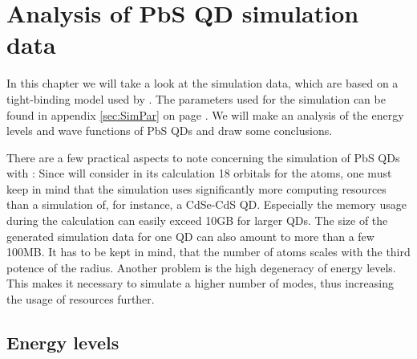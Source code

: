 \chapter{Analysis of PbS QD simulation data}

In this chapter we will take a look at the simulation data, which are based on a tight-binding model used by \omen. The parameters used for the simulation can be found in appendix \ref{sec:SimPar} on page \pageref{sec:SimPar}. We will make an analysis of the energy levels and wave functions of PbS QDs and draw some conclusions.\\

\begin{REMARK} 
There are a few practical aspects to note concerning the simulation of PbS QDs with \omen: Since \omen will consider in its calculation 18 orbitals for the atoms, one must keep in mind that the simulation uses significantly more computing resources than a simulation of, for instance, a CdSe-CdS QD. Especially the memory usage during the calculation can easily exceed 10GB for larger QDs. The size of the generated simulation data for one QD can also amount to more than a few 100MB. It has to be kept in mind, that the number of atoms scales with the third potence of the radius. Another problem is the high degeneracy of energy levels. This makes it necessary to simulate a higher number of modes, thus increasing the usage of resources further.
\end{REMARK}

\section{Energy levels}

